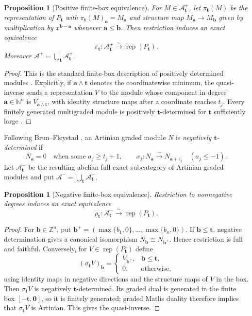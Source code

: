 \documentclass[12pt,reqno]{amsart}
\newtheorem{proposition}[theorem]{Proposition}
\theoremstyle{definition}
\theoremstyle{remark}
\newcommand{\Rep}{\operatorname{rep}}
\begin{document}
\begin{proposition}[Positive finite-box equivalence]\label{prop:positive-box}
For $M\in\mathcal A^+_{\mathbf t}$, let $\pi_{\mathbf t}(M)$ be the
representation of $P_{\mathbf t}$ with
$\pi_{\mathbf t}(M)_{\mathbf a}=M_{\mathbf a}$ and structure map
$M_{\mathbf a}\to M_{\mathbf b}$ given by multiplication by
$x^{\mathbf b-\mathbf a}$ whenever $\mathbf a\le\mathbf b$.
Then restriction induces an exact equivalence
\[
\pi_{\mathbf t}:\mathcal A^+_{\mathbf t}\xrightarrow{\sim}\Rep(P_{\mathbf t}).
\]
Moreover $\mathcal A^+=\bigcup_{\mathbf t}\mathcal A^+_{\mathbf t}$.
\end{proposition}
\begin{proof}
This is the standard finite-box description of positively determined modules
\cite{BF,Miller}.  Explicitly, if $\mathbf a\wedge\mathbf t$ denotes the
coordinatewise minimum, the quasi-inverse sends a representation $V$ to the
module whose component in degree $\mathbf a\in\mathbb N^n$ is
$V_{\mathbf a\wedge\mathbf t}$, with identity structure maps after a
coordinate reaches $t_j$.  Every finitely generated multigraded module is positively
$\mathbf t$-determined for $\mathbf t$ sufficiently large \cite{Miller}.
\end{proof}

Following Brun--Fl\o ystad \cite[Remark~2.9]{BF}, an Artinian graded module
$N$ is \emph{negatively $\mathbf t$-determined} if
\[
N_{\mathbf a}=0\quad\text{when some }a_j\ge t_j+1,
\qquad
x_j:N_{\mathbf a}\xrightarrow{\sim}N_{\mathbf a+\varepsilon_j}
\quad(a_j\le-1).
\]
Let $\mathcal A^-_{\mathbf t}$ be the resulting abelian full exact subcategory
of Artinian graded modules and put
$\mathcal A^-=\bigcup_{\mathbf t}\mathcal A^-_{\mathbf t}$.

\begin{proposition}[Negative finite-box equivalence]\label{prop:negative-box}
Restriction to nonnegative degrees induces an exact equivalence
\[
\rho_{\mathbf t}:\mathcal A^-_{\mathbf t}
\xrightarrow{\sim}\Rep(P_{\mathbf t}).
\]
\end{proposition}

\begin{proof}
For $\mathbf b\in\mathbb Z^n$, put
$\mathbf b^+=(\max\{b_1,0\},\ldots,\max\{b_n,0\})$.  If
$\mathbf b\le\mathbf t$, negative determination gives a canonical isomorphism
$N_{\mathbf b}\cong N_{\mathbf b^+}$.  Hence restriction is full
and faithful.  Conversely, for $V\in\Rep(P_{\mathbf t})$ define
\[
(\sigma_{\mathbf t}V)_{\mathbf b}=
\begin{cases}
V_{\mathbf b^+},&\mathbf b\le\mathbf t,\\
0,&\text{otherwise},
\end{cases}
\]
using identity maps in negative directions and the structure maps of $V$ in
the box.  Then $\sigma_{\mathbf t}V$ is negatively $\mathbf t$-determined.
Its graded dual is generated in the finite box $[-\mathbf t,\mathbf0]$, so it
is finitely generated; graded Matlis duality therefore implies that
$\sigma_{\mathbf t}V$ is Artinian.  This gives the quasi-inverse.
\end{proof}
\end{document}
